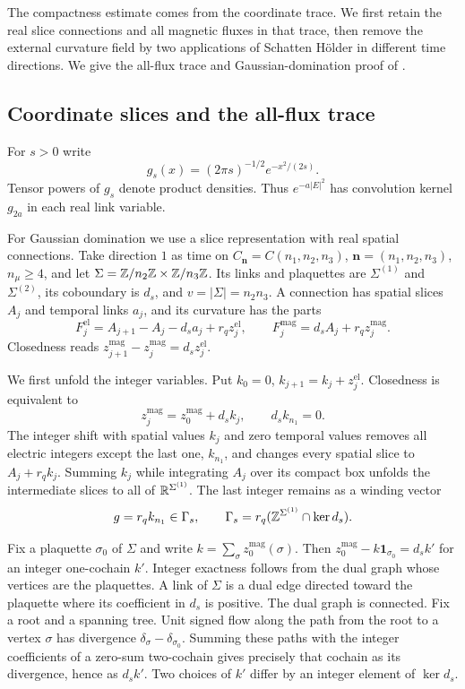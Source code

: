 The compactness estimate comes from the coordinate trace. We first
retain the real slice connections and all magnetic fluxes in that
trace, then remove the external curvature field by two applications
of Schatten H\"older in different time directions. We give the all-flux
trace and Gaussian-domination proof of
\cite[Section~5.8 and Theorem~6.27]{ChamberQED}.

\subsection{Coordinate slices and the all-flux trace}\label{subsec:slab-coordinate-trace}

For $s>0$ write
\[
 g_s(x)=(2\pi s)^{-1/2}e^{-x^2/(2s)}.
\]
Tensor powers of $g_s$ denote product densities. Thus $e^{-a|E|^2}$
has convolution kernel $g_{2a}$ in each real link variable.

For Gaussian domination we use a slice representation with real
spatial connections. Take direction $1$ as time on
$C_{\mathbf n}=C(n_1,n_2,n_3)$, $\mathbf n=(n_1,n_2,n_3)$,
$n_\mu\ge4$, and let
$\Sigma=\mathbb Z/n_2\mathbb Z\times\mathbb Z/n_3\mathbb Z$. Its links and plaquettes are
$\Sigma^{(1)}$ and $\Sigma^{(2)}$, its coboundary is $d_s$, and
$v=|\Sigma|=n_2n_3$. A connection has spatial slices $A_j$ and
temporal links $a_j$, and its curvature has the parts
\begin{equation}\label{eq:slab-slice-curvatures}
 F_j^{\mathrm{el}}=A_{j+1}-A_j-d_sa_j+r_qz_j^{\mathrm{el}},
 \qquad F_j^{\mathrm{mag}}=d_sA_j+r_qz_j^{\mathrm{mag}}.
\end{equation}
Closedness reads
$z_{j+1}^{\mathrm{mag}}-z_j^{\mathrm{mag}}=d_sz_j^{\mathrm{el}}$.

We first unfold the integer variables. Put
$k_0=0$, $k_{j+1}=k_j+z_j^{\mathrm{el}}$. Closedness is equivalent to
\[
 z_j^{\mathrm{mag}}=z_0^{\mathrm{mag}}+d_sk_j,
                       \qquad d_sk_{n_1}=0.
\]
The integer shift with spatial values $k_j$ and zero temporal values
removes all electric integers except the last one, $k_{n_1}$, and
changes every spatial slice to $A_j+r_qk_j$. Summing $k_j$ while
integrating $A_j$ over its compact box unfolds the intermediate
slices to all of $\mathbb R^{\Sigma^{(1)}}$. The last integer remains as a
winding vector
\[
 g=r_qk_{n_1}\in\Gamma_s,
 \qquad\Gamma_s=r_q(\mathbb Z^{\Sigma^{(1)}}\cap\ker d_s).
\]

Fix a plaquette $\sigma_0$ of $\Sigma$ and write
$k=\sum_\sigma z_0^{\mathrm{mag}}(\sigma)$. Then
$z_0^{\mathrm{mag}}-k\mathbf1_{\sigma_0}=d_sk'$ for an integer
one-cochain $k'$. Integer exactness follows from the dual graph whose
vertices are the plaquettes. A link of
$\Sigma$ is a dual edge directed toward the plaquette where its
coefficient in $d_s$ is positive. The dual graph is connected. Fix
a root and a spanning tree. Unit signed flow along the path from the
root to a vertex $\sigma$ has divergence
$\delta_\sigma-\delta_{\sigma_0}$. Summing these paths with the
integer coefficients of a zero-sum two-cochain gives precisely that
cochain as its divergence, hence as $d_sk'$. Two choices of $k'$
differ by an integer element of $\ker d_s$.

